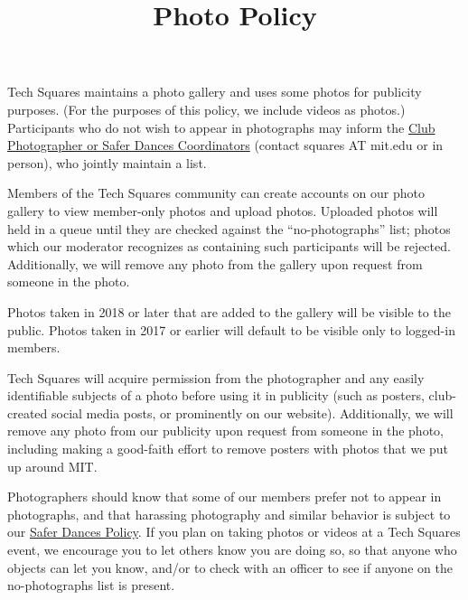 \documentclass{article}
\title{Photo Policy}
\date{}
\newcommand{\baseurl}{\latexhtml{http://www.mit.edu/~tech-squares/govdocs/}{}}
\newcommand{\matchextension}{.\latexhtml{pdf}{html}}
\newcommand{\matchlink}[2]{\href{\baseurl#1\matchextension}{#2}}
\begin{document}
\maketitle

Tech Squares maintains a photo gallery and uses some photos for publicity purposes. (For the purposes of this policy, we include videos as photos.) Participants who do not wish to appear in photographs may inform the \href{http://www.mit.edu/~tech-squares/officers.html}{Club Photographer or Safer Dances Coordinators} (contact squares AT mit.edu or in person), who jointly maintain a list.

Members of the Tech Squares community can create accounts on our photo gallery to view member-only photos and upload photos. Uploaded photos will held in a queue until they are checked against the “no-photographs” list; photos which our moderator recognizes as containing such participants will be rejected. Additionally, we will remove any photo from the gallery upon request from someone in the photo.

Photos taken in 2018 or later that are added to the gallery will be visible to the public. Photos taken in 2017 or earlier will default to be visible only to logged-in members.

Tech Squares will acquire permission from the photographer and any easily identifiable subjects of a photo before using it in publicity (such as posters, club-created social media posts, or prominently on our website). Additionally, we will remove any photo from our publicity upon request from someone in the photo, including making a good-faith effort to remove posters with photos that we put up around MIT.

Photographers should know that some of our members prefer not to appear in photographs, and that harassing photography and similar behavior is subject to our \matchlink{safer-dances}{Safer Dances Policy}. If you plan on taking photos or videos at a Tech Squares event, we encourage you to let others know you are doing so, so that anyone who objects can let you know, and/or to check with an officer to see if anyone on the no-photographs list is present.
\end{document}
